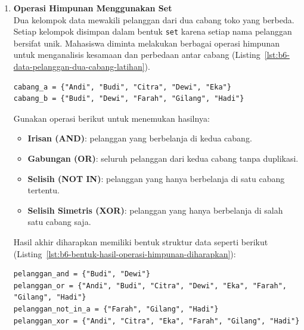 \begin{enumerate}
  \begin{promptterarah}
  Saya sedang menggabungkan dua dictionary berisi harga dan stok produk berdasarkan kriteria tertentu. Jangan tuliskan kodenya. Tanyakan cara saya mencocokkan kunci di kedua dictionary, lalu beri petunjuk bila rencananya keliru. Setelah saya mengirim kode, periksa dan tunjukkan bagian yang keliru tanpa memberi kode yang benar.
  \end{promptterarah}
\item \textbf{Operasi Himpunan Menggunakan Set} \\
Dua kelompok data mewakili pelanggan dari dua cabang toko yang berbeda. 
Setiap kelompok disimpan dalam bentuk \texttt{set} karena setiap nama pelanggan bersifat unik.  
Mahasiswa diminta melakukan berbagai operasi himpunan untuk menganalisis kesamaan dan perbedaan antar cabang (Listing~\ref{lst:b6-data-pelanggan-dua-cabang-latihan}).

\begin{lstlisting}[style=PythonStyle, caption={Data pelanggan dua cabang untuk latihan}, label={lst:b6-data-pelanggan-dua-cabang-latihan}]
cabang_a = {"Andi", "Budi", "Citra", "Dewi", "Eka"}
cabang_b = {"Budi", "Dewi", "Farah", "Gilang", "Hadi"}
\end{lstlisting}

Gunakan operasi berikut untuk menemukan hasilnya:
\begin{itemize}
  \item \textbf{Irisan (AND)}: pelanggan yang berbelanja di kedua cabang.
  \item \textbf{Gabungan (OR)}: seluruh pelanggan dari kedua cabang tanpa duplikasi.
  \item \textbf{Selisih (NOT IN)}: pelanggan yang hanya berbelanja di satu cabang tertentu.
  \item \textbf{Selisih Simetris (XOR)}: pelanggan yang hanya berbelanja di salah satu cabang saja.
\end{itemize}

Hasil akhir diharapkan memiliki bentuk struktur data seperti berikut (Listing~\ref{lst:b6-bentuk-hasil-operasi-himpunan-diharapkan}):

\begin{lstlisting}[style=PythonStyle, caption={Bentuk hasil operasi himpunan yang diharapkan}, label={lst:b6-bentuk-hasil-operasi-himpunan-diharapkan}]
pelanggan_and = {"Budi", "Dewi"}
pelanggan_or = {"Andi", "Budi", "Citra", "Dewi", "Eka", "Farah", "Gilang", "Hadi"}
pelanggan_not_in_a = {"Farah", "Gilang", "Hadi"}
pelanggan_xor = {"Andi", "Citra", "Eka", "Farah", "Gilang", "Hadi"}
\end{lstlisting}


\end{enumerate}
